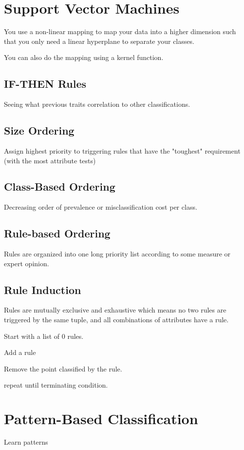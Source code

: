 \documentclass[fleqn]{report}
\begin{document}
\section{Support Vector Machines}
You use a non-linear mapping to map your data into a higher dimension such 
that you only need a linear hyperplane to separate your classes.

You can also do the mapping using a kernel function.

\subsection{IF-THEN Rules}
Seeing what previous traits correlation to other classifications.

\subsection{Size Ordering}
Assign highest priority to triggering rules that have the "toughest"
requirement (with the most attribute tests)

\subsection{Class-Based Ordering}
Decreasing order of prevalence or misclassification cost per class.

\subsection{Rule-based Ordering}
Rules are organized into one long priority list according to 
some measure or expert opinion.


\subsection{Rule Induction}
Rules are mutually exclusive and exhaustive which means 
no two rules are triggered by the same tuple, and all combinations 
of attributes have a rule.

Start with a list of 0 rules.

Add a rule

Remove the point classified by the rule. 

repeat until terminating condition.

\section{Pattern-Based Classification}
Learn patterns 
\end{document}
